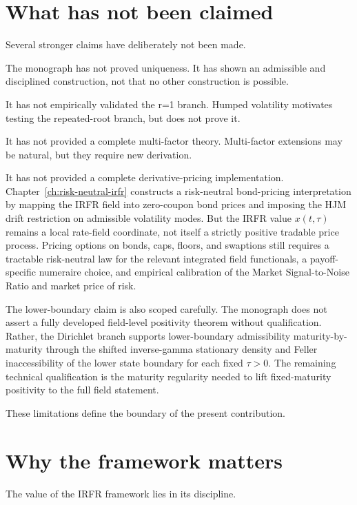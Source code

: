 \documentclass[11pt,oneside]{book}
\begin{document}
\section{What has not been claimed}\label{what-has-not-been-claimed}

Several stronger claims have deliberately not been made.

The monograph has not proved uniqueness. It has shown an admissible and
disciplined construction, not that no other construction is possible.

It has not empirically validated the r=1 branch. Humped volatility
motivates testing the repeated-root branch, but does not prove it.

It has not provided a complete multi-factor theory. Multi-factor
extensions may be natural, but they require new derivation.

It has not provided a complete derivative-pricing implementation. Chapter~\ref{ch:risk-neutral-irfr}
constructs a risk-neutral bond-pricing interpretation by mapping the IRFR field into zero-coupon bond prices and imposing the HJM drift restriction on admissible volatility modes. But the IRFR value \(x(t,\tau)\) remains a local rate-field coordinate, not itself a strictly positive tradable price process. Pricing options on bonds, caps, floors, and swaptions still requires a tractable risk-neutral law for the relevant integrated field functionals, a payoff-specific numeraire choice, and empirical calibration of the Market Signal-to-Noise Ratio and market price of risk.

The lower-boundary claim is also scoped carefully. The monograph does
not assert a fully developed field-level positivity theorem without
qualification. Rather, the Dirichlet branch supports lower-boundary
admissibility maturity-by-maturity through the shifted inverse-gamma
stationary density and Feller inaccessibility of the lower state
boundary for each fixed $\tau>0$. The remaining technical
qualification is the maturity regularity needed to lift fixed-maturity
positivity to the full field statement.

These limitations define the boundary of the present contribution.

\section{Why the framework matters}\label{why-the-framework-matters}

The value of the IRFR framework lies in its discipline.
\end{document}
